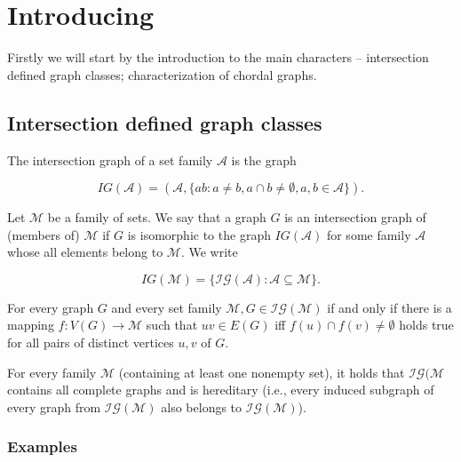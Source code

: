 \chapter{Introducing}

Firstly we will start by the introduction to the main characters -- intersection defined graph classes; characterization of chordal graphs.

\section{Intersection defined graph classes}

\begin{defn}
	The intersection graph of a set family $\mathcal{A}$ is the graph
	
	$$
	IG(\mathcal{A}) = (\mathcal{A}, \{ab : a \neq b, a \cap b \neq \emptyset, a, b \in \mathcal{A}\}).
	$$
\end{defn}

\begin{defn}
	Let $\mathcal{M}$ be a family of sets. We say that a graph $G$ is an intersection graph of (members of) $\mathcal{M}$ if $G$ is isomorphic to the graph $IG(\mathcal{A})$ for some family $\mathcal{A}$ whose all elements belong to $\mathcal{M}$. We write
	
	$$
	IG(\mathcal{M}) = \{\mathcal{IG}(\mathcal{A}) : \mathcal{A} \subseteq \mathcal{M}\}.
	$$
\end{defn}

\begin{observ}
	For every graph $G$ and every set family $\mathcal{M}, G \in \mathcal{IG}(\mathcal{M})$ if and only if there is a mapping $f : V (G) \to \mathcal{M}$ such that $uv \in E(G)$ iff $f(u) \cap f(v) \neq \emptyset$ holds true for all pairs of distinct vertices $u, v$ of $G$.
\end{observ}

\begin{observ}
	For every family $\mathcal{M}$ (containing at least one nonempty set), it holds that $\mathcal{IG}(\mathcal{M}$ contains all complete graphs and is hereditary (i.e., every induced subgraph of every graph from $\mathcal{IG}(\mathcal{M})$ also	belongs to $\mathcal{IG}(\mathcal{M})$).
\end{observ}

\subsection{Examples}

